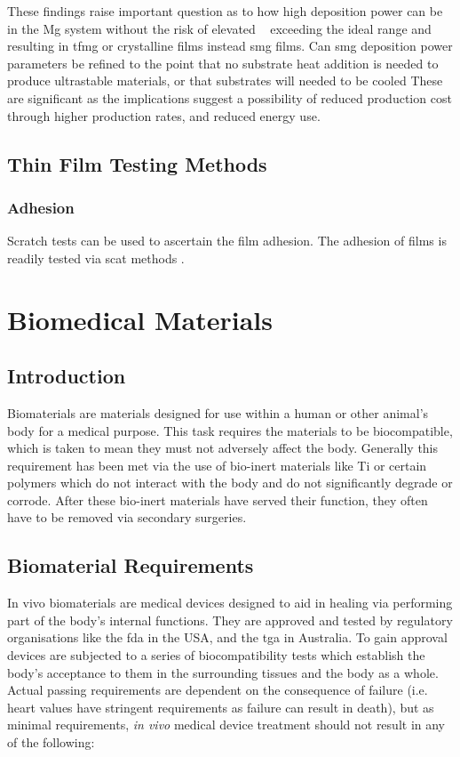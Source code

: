 \documentclass[a4paper,12pt,oneside]{report}%
\begin{document}
These findings raise important question as to how high deposition power can be in the Mg system without the risk of elevated \Tsub~ exceeding the ideal range and resulting in \gls{tfmg} or crystalline films instead \gls{smg} films. Can \gls{smg} deposition power parameters be refined to the point that no substrate heat addition is needed to produce ultrastable materials, or that substrates will needed to be cooled These are significant as the implications suggest a possibility of reduced production cost through higher production rates, and reduced energy use. 
 
\subsection{Thin Film Testing Methods}
\subsubsection{Adhesion}
Scratch tests can be used to ascertain the film adhesion. 
The adhesion of films is readily tested via scat methods \cite{Bull1996, Burnett1987, Burnett1988, Pan2010}.

\section{Biomedical Materials} 
\subsection{Introduction}
Biomaterials are materials designed for use within a human or other animal's body for a medical purpose. This task requires the materials to be biocompatible, which is taken to mean they must not adversely affect the body. Generally this requirement has been met via the use of bio-inert materials like Ti or certain polymers which do not interact with the body and do not significantly degrade or corrode. After these bio-inert materials have served their function, they often have to be removed via secondary surgeries. 

\subsection{Biomaterial Requirements} 
In vivo biomaterials are medical devices designed to aid in healing via performing part of the body's internal functions. They are approved and tested by regulatory organisations like the \gls{fda} in the USA, and the \gls{tga} in Australia. To gain approval devices are subjected to a series of biocompatibility tests which establish the body's acceptance to them in the surrounding tissues and the body as a whole. Actual passing requirements are dependent on the consequence of failure (i.e. heart values have stringent requirements as failure can result in death), but as minimal requirements, \textit{in vivo} medical device treatment should not result in any of the following:
\end{document}
